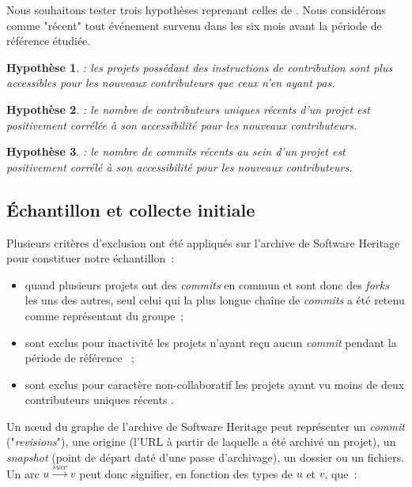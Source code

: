 \documentclass[dvipsnames,runningheads]{llncs}
\newcommand{\en}[1]{\foreignlanguage{english}{\emph{#1}}}
\newtheorem{hypo}{Hypothèse}[theorem]
\begin{document}
    Nous souhaitons tester trois hypothèses reprenant celles de \textcite[voir p.~11-13 et 16]{signals-2019}.
    Nous considérons comme "récent" tout événement survenu dans les six mois avant la période de référence
    étudiée.

    \newcommand{\newhyp}[2]{%
        \begin{hypo}
            \label{hyp:#1}: #2
        \end{hypo}%
    }

    \newhyp{contributionguidelines}{%
        les projets possédant des instructions de contribution sont plus accessibles pour les nouveaux
        contributeurs que ceux n'en ayant pas.%
    }

    \newhyp{recentcontributorcount}{%
        le nombre de contributeurs uniques récents d'un projet est positivement corrélée à son accessibilité
        pour les nouveaux contributeurs.%
    }

    \newhyp{recentcommitcount}{%
        le nombre de \en{commits} récents au sein d'un projet est positivement corrélé à son accessibilité
        pour les nouveaux contributeurs.%
    }

    \subsection{Échantillon et collecte initiale}
    \label{sec:constitution_echantillon}

    Plusieurs critères d'exclusion ont été appliqués sur l'archive de Software Heritage pour constituer notre
    échantillon :

    \begin{itemize}
        \item quand plusieurs projets ont des \en{commits} en commun et sont donc des \en{forks} les uns des
            autres, seul celui qui la plus longue chaîne de \en{commits} a été retenu comme représentant du
            groupe ;
        \item sont exclus pour inactivité les projets n'ayant reçu aucun \en{commit} pendant la période de
            référence \parencite[voir][]{mining-github-2014} ;
        \item sont exclus pour caractère non-collaboratif les projets ayant vu moins de deux
            contributeurs uniques récents \parencite[voir][]{mining-github-2014}.
    \end{itemize}

    Un nœud du graphe de l'archive de Software Heritage peut représenter un \en{commit} ("\en{revisions}"),
    une origine (l'URL à partir de laquelle a été archivé un projet), un \en{snapshot} (point de départ daté
    d'une passe d'archivage), un dossier ou un fichiers. Un arc $u \xrightarrow{succ} v$ peut donc signifier,
    en fonction des types de $u$ et $v$, que : 
\end{document}
